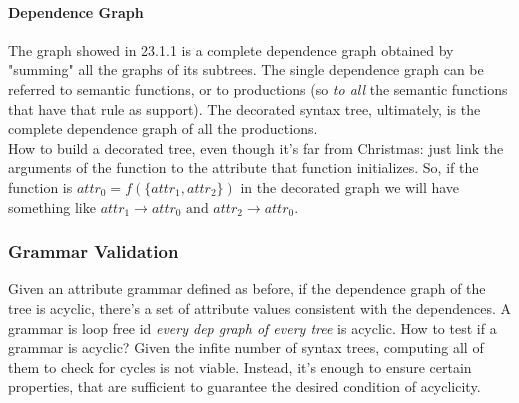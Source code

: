 \documentclass[10pt,a4paper]{article}
\begin{document}
					\paragraph{Dependence Graph}
						The graph showed in 23.1.1 is a complete dependence graph obtained by "summing" all the graphs of its subtrees. The single dependence graph can be referred to semantic functions, or to productions (so \emph{to all} the semantic functions that have that rule as support). The decorated syntax tree, ultimately, is the complete dependence graph of all the productions.\\
						How to build a decorated tree, even though it's far from Christmas: just link the arguments of the function to the attribute that function initializes. So, if the function is $attr_0 = f(\{attr_1, attr_2\})$ in the decorated graph we will have something like $attr_1 \rightarrow attr_0 \text{ and } attr_2 \rightarrow attr_0$.
				
				\subsubsection{Grammar Validation}
					Given an attribute grammar defined as before, if the dependence graph of the tree is acyclic, there's a set of attribute values consistent with the dependences. A grammar is loop free id \emph{every dep graph of every tree} is acyclic. How to test if a grammar is acyclic? Given the infite number of syntax trees, computing all of them to check for cycles is not viable. Instead, it's enough to ensure certain properties, that are sufficient to guarantee the desired condition of acyclicity.
					
\end{document}

